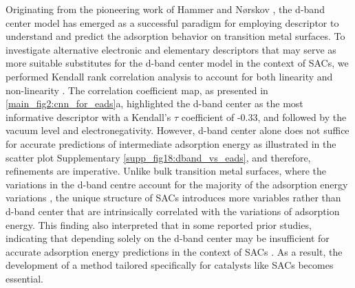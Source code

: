 Originating from the pioneering work of Hammer and Nørskov \cite{hammer2000theoretical},
the d-band center model has emerged as a successful paradigm for employing descriptor to understand and predict the adsorption behavior on transition metal surfaces.
To investigate alternative electronic and elementary descriptors that may serve as more suitable substitutes for the d-band center model in the context of SACs,
we performed Kendall rank correlation analysis to account for both linearity and non-linearity \cite{kendall1938new}.
The correlation coefficient map, as presented in \cref{main_fig2:cnn_for_eads}a, highlighted the d-band center as the most informative descriptor with a Kendall's $\tau$ coefficient of -0.33, and followed by the vacuum level and electronegativity.
However, d-band center alone does not suffice for accurate predictions of intermediate adsorption energy as illustrated in the scatter plot Supplementary \cref{supp_fig18:dband_vs_eads}, and therefore, refinements are imperative.
Unlike bulk transition metal surfaces, where the variations in the d-band centre account for the majority of the adsorption energy variations \cite{norskov2011density, takigawa2016machine}, the unique structure of SACs introduces more variables rather than d-band center that are intrinsically correlated with the variations of adsorption energy.
This finding also interpreted that in some reported prior studies, indicating that depending solely on the d-band center may be insufficient for accurate adsorption energy predictions in the context of SACs \cite{sun2022going, fung2020descriptors, di2022universal, yuan2020descriptor, huang2020rational}.
As a result, the development of a method tailored specifically for catalysts like SACs becomes essential.


